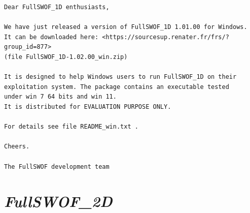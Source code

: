 \documentclass[a4paper, 11pt]{article}
\newcommand{\FullSWOFtwoD}{\emph{FullSWOF\_2D}}
\begin{document}
\begin{enumerate}
\begin{verbatim}
Dear FullSWOF_1D enthusiasts,

We have just released a version of FullSWOF_1D 1.01.00 for Windows.
It can be downloaded here: <https://sourcesup.renater.fr/frs/?group_id=877>
(file FullSWOF_1D-1.02.00_win.zip)

It is designed to help Windows users to run FullSWOF_1D on their 
exploitation system. The package contains an executable tested
under win 7 64 bits and win 11.
It is distributed for EVALUATION PURPOSE ONLY.

For details see file README_win.txt .

Cheers.

The FullSWOF development team 
\end{verbatim}
\end{enumerate}



\section{\FullSWOFtwoD{}}
\end{document}
